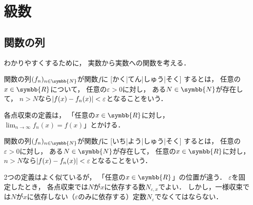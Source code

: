\documentclass[../sotsu.tex]{subfiles}
\begin{document}
\section{級数}
\label{sec:series}


\subsection{関数の列}

わかりやすくするために，
実数から実数への関数を考える．

\begin{definition}
    \label{dfn:pointwise-convergence}
    関数の列$\sequ{f_n}[n \in \symbb{N}]$が関数$f$に%
    [かく|てん|しゅう|そく]%
    するとは，
    任意の$x \in \symbb{R}$について，
    任意の$\varepsilon > 0$に対し，
    ある$N \in \symbb{N}$が存在して，
    $n > N$なら$\lvert f(x) - f_n (x)\rvert < \varepsilon$となることをいう．
\end{definition}

各点収束の定義は，
「任意の$x \in \symbb{R}$に対し，
$\lim_{n \to \infty} f_n (x) = f(x)$」とかける．

\begin{definition}
    \label{dfn:uniform-convergence}
    関数の列$\sequ{f_n}[n \in \symbb{N}]$が関数$f$に%
    [いち|よう|しゅう|そく]%
    するとは，
    任意の$\varepsilon > 0$に対し，
    ある$N \in \symbb{N}$が存在して，
    任意の$x \in \symbb{R}$に対し，
    $n > N$なら$\lvert f(x) - f_n (x)\rvert < \varepsilon$となることをいう．
\end{definition}

2つの定義はよく似ているが，
「任意の$x \in \symbb{R}$」の位置が違う．
$\varepsilon$を固定したとき，
各点収束では$N$が$x$に依存する数$N_{\varepsilon, x}$でよい．
しかし，一様収束では$N$が$x$に依存しない（$\varepsilon$のみに依存する）定数$N_\varepsilon$でなくてはならない．
\end{document}
